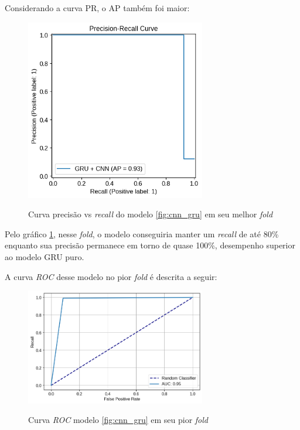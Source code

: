 Considerando a curva PR, o AP também foi maior:

\begin{figure}[H]
  \centering
  \caption{Curva precisão vs \textit{recall} do modelo \ref{fig:cnn_gru} em seu melhor \textit{fold}}
   \includegraphics[width=0.7\textwidth]{figuras/modelos_resultados/gru_cnn/ap_gru_cnn_melhor_fold_1.png} 
  \label{fig:ap_cnn_gru_melhor_fold}
\end{figure}

Pelo gráfico \ref{fig:ap_cnn_gru_melhor_fold}, nesse \textit{fold}, o modelo conseguiria manter um \textit{recall} de até 80\%
enquanto sua precisão permanece em torno de quase 100\%, desempenho superior ao modelo GRU puro.

A curva \textit{ROC} desse modelo no pior \textit{fold} é descrita a seguir:

\begin{figure}[H]
  \centering
  \caption{Curva \textit{ROC} modelo \ref{fig:cnn_gru} em seu pior \textit{fold}}
   \includegraphics[width=0.7\textwidth]{figuras/modelos_resultados/gru_cnn/roc_cnn_pior_fold_3.png} 
  \label{fig:roc_cnn_gru_pior_fold}
\end{figure}


